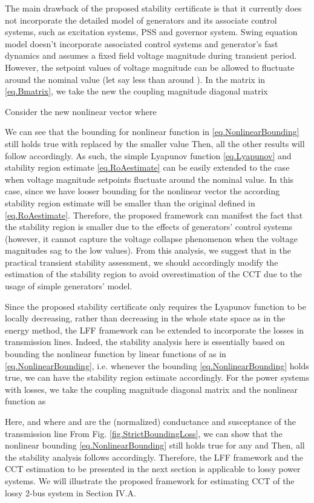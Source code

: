 \documentclass[final]{IEEEtran}
\begin{document}
\begin{remark} The main drawback of the proposed
stability certificate is that it currently does not incorporate
the detailed model of generators and its associate control
systems, such as excitation systems, PSS and governor system.
Swing equation model doesn't incorporate associated control
systems and generator's fast dynamics and assumes a fixed field
voltage magnitude during transient period. However, the setpoint
values of voltage magnitude can be allowed to fluctuate around the
nominal value  (let say less than  around ). In
the matrix  in \eqref{eq.Bmatrix}, we take the new the coupling
magnitude diagonal matrix

Consider the new nonlinear vector
 where

We can see that the bounding for nonlinear function  in
\eqref{eq.NonlinearBounding} still holds true with 
replaced by the smaller value  Then, all the
other results will follow accordingly. As such, the simple
Lyapunov function  \eqref{eq.Lyapunov} and stability region
estimate \eqref{eq.RoAestimate} can be easily extended to the case
when voltage magnitude setpoints fluctuate  around the
nominal value. In this case, since we have looser bounding for the
nonlinear vector  the according stability region estimate will
be smaller than the original defined in \eqref{eq.RoAestimate}.
Therefore, the proposed framework can manifest the fact that the
stability region is smaller due to the effects of generators'
control systems (however, it cannot capture the  voltage collapse
phenomenon  when the voltage magnitudes sag to the low values).
From this analysis, we suggest that in the practical transient stability assessment, we should accordingly modify the estimation of the stability region to avoid overestimation of the CCT
due to the usage of simple generators' model.
\end{remark}

\begin{remark} Since the proposed stability
certificate only requires the Lyapunov function to be locally
decreasing, rather than decreasing in the whole state space as in
the energy method, the LFF framework can be extended to
incorporate the losses in transmission lines. Indeed, the
stability analysis here is essentially based on bounding the
nonlinear function  by linear functions of 
as in \eqref{eq.NonlinearBounding}, i.e. whenever the bounding
\eqref{eq.NonlinearBounding}  holds true, we can have the
stability region estimate accordingly. For the power systems with
losses, we take the coupling magnitude diagonal matrix
 and
the nonlinear function  as

Here,  and
 where  and
 are the (normalized) conductance and susceptance of the
transmission line  From Fig.
\ref{fig.StrictBoundingLoss}, we can show that the nonlinear
bounding \eqref{eq.NonlinearBounding} still holds true for any
 and
 Then, all the stability analysis follows accordingly. Therefore, the LFF framework and the CCT estimation to be presented in the next section is applicable to lossy power systems. We will illustrate the proposed framework for estimating CCT of the lossy 2-bus system in Section IV.A.
\end{remark}
\end{document}
